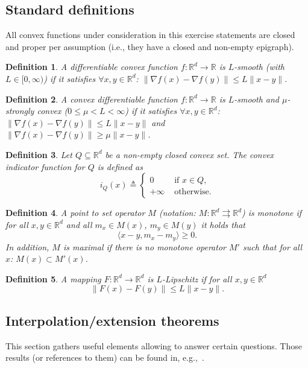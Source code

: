 \documentclass[11pt,a4paper]{article}
\newcommand{\inner}[2]{{\langle #1, #2\rangle}}
\newtheorem{definition}{Definition}
\begin{document}
	\subsection{Standard definitions}
	All convex functions under consideration in this exercise statements are closed and proper per assumption (i.e., they have a closed and non-empty epigraph).
	\begin{definition}\label{def:smoothconvex}
	A differentiable convex function $f:\mathbb{R}^d\rightarrow \mathbb{R}$ is $L$-smooth (with $L\in [0,\infty)$) if it satisfies $\forall x,y\in\mathbb{R}^d$: $\|\nabla f(x)-\nabla f(y)\|\leqslant L \|x-y\|$.
	\end{definition}
	\begin{definition}\label{def:smoothstronglyconvex}
	A convex differentiable function $f:\mathbb{R}^d\rightarrow \mathbb{R}$ is $L$-smooth and $\mu$-strongly convex ($0\leqslant \mu<L<\infty$) if it satisfies $\forall x,y\in\mathbb{R}^d$: $\|\nabla f(x)-\nabla f(y)\|\leqslant L \|x-y\|$ and $\|\nabla f(x)-\nabla f(y)\|\geqslant \mu \|x-y\|$.
	\end{definition}
	\begin{definition}\label{def:indicator}
	Let $Q\subseteq \mathbb{R}^d$ be a non-empty closed convex set. The convex indicator function for $Q$ is defined as 
	\[ i_Q(x) \triangleq \left\{\begin{array}{ll}0 &\text{ if }x\in Q,\\+\infty &\text{ otherwise.}\end{array}\right. \]
	\end{definition}
	\begin{definition}\label{def:monotone}
	A point to set operator $M$ (notation: $M:\mathbb{R}^d\rightrightarrows\mathbb{R}^d$) is monotone if for all $x,y\in\mathbb{R}^d$ and all $m_x\in M(x)$, $m_y\in M(y)$ it holds that
	\[ \inner{ x-y}{m_x-m_y}\geqslant 0.\]
In addition, $M$ is maximal if there is no monotone operator $M'$ such that for all $x$: $M(x)\subset M'(x)$.
	\end{definition}
	\begin{definition}\label{def:Lipschitz}
	A mapping $F:\mathbb{R}^d\rightarrow\mathbb{R}^d$ is $L$-Lipschitz if for all $x,y\in\mathbb{R}^d$ 
	\[ \|F(x)-F(y)\|\leqslant L\|x-y\|.\]
	\end{definition}
	
	\subsection{Interpolation/extension theorems}
	This section gathers useful elements allowing to answer certain questions. Those results (or references to them) can be found in, e.g.,~\cite{taylor2015exact,ryu2016primer}.
\end{document}
